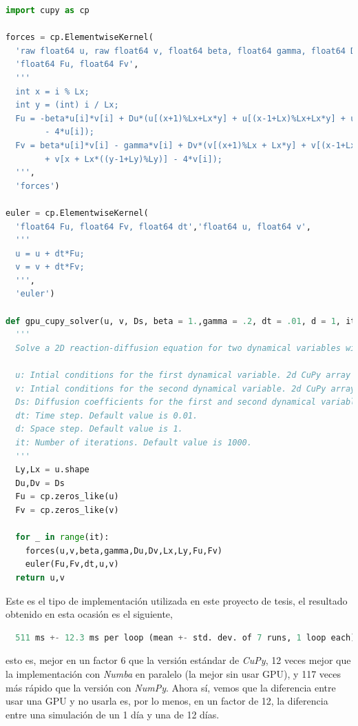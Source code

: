 \begin{lstlisting}[language=Python,caption = Implementación con \textit{CuPy}.,label = {lst:CuPy}]
import cupy as cp

forces = cp.ElementwiseKernel(
  'raw float64 u, raw float64 v, float64 beta, float64 gamma, float64 Du, float64 Dv, uint32 Lx, uint32 Ly',
  'float64 Fu, float64 Fv',
  '''
  int x = i % Lx;
  int y = (int) i / Lx;
  Fu = -beta*u[i]*v[i] + Du*(u[(x+1)%Lx+Lx*y] + u[(x-1+Lx)%Lx+Lx*y] + u[x+Lx*((y+1)%Ly)] + u[x+Lx*((y-1+Ly)%Ly)]
        - 4*u[i]);
  Fv = beta*u[i]*v[i] - gamma*v[i] + Dv*(v[(x+1)%Lx + Lx*y] + v[(x-1+Lx)%Lx+Lx*y] + v[x + Lx*((y+1)%Ly)] 
        + v[x + Lx*((y-1+Ly)%Ly)] - 4*v[i]);
  ''',
  'forces')

euler = cp.ElementwiseKernel(
  'float64 Fu, float64 Fv, float64 dt','float64 u, float64 v',
  '''
  u = u + dt*Fu;
  v = v + dt*Fv;
  ''',
  'euler')

def gpu_cupy_solver(u, v, Ds, beta = 1.,gamma = .2, dt = .01, d = 1, it = 1000):
  '''
  Solve a 2D reaction-diffusion equation for two dynamical variables with periodic boundary conditions using CuPy.

  u: Intial conditions for the first dynamical variable. 2d CuPy array of shape (Ly,Lx).
  v: Intial conditions for the second dynamical variable. 2d CuPy array of shape (Ly,Lx).
  Ds: Diffusion coefficients for the first and second dynamical variables. List or array of length 2.
  dt: Time step. Default value is 0.01.
  d: Space step. Default value is 1.
  it: Number of iterations. Default value is 1000.
  ''' 
  Ly,Lx = u.shape
  Du,Dv = Ds
  Fu = cp.zeros_like(u)
  Fv = cp.zeros_like(v)

  for _ in range(it):
    forces(u,v,beta,gamma,Du,Dv,Lx,Ly,Fu,Fv)
    euler(Fu,Fv,dt,u,v)
  return u,v
\end{lstlisting}

Este es el tipo de implementación utilizada en este proyecto de tesis, el resultado obtenido en esta ocasión es el siguiente,
\begin{lstlisting}[language=Python]
  %timeit gpu_cupy_solver(u,v,Ds)
  511 ms +- 12.3 ms per loop (mean +- std. dev. of 7 runs, 1 loop each)
\end{lstlisting}
esto es, mejor en un factor $6$ que la versión estándar de \textit{CuPy}, 12 veces mejor que la implementación con \textit{Numba} en paralelo 
(la mejor sin usar GPU), y 117 veces más rápido que la versión con \textit{NumPy}. Ahora sí, vemos que la diferencia entre usar una GPU y no usarla es, 
por lo menos, en un factor de 12, la diferencia entre una simulación de un 1 día  y una de 12 días.

